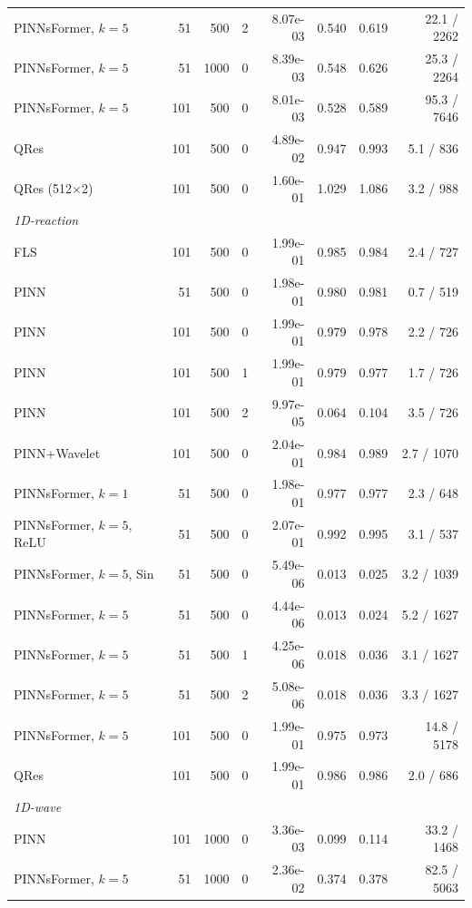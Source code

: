 \begin{table}[ht]
\begin{center}
\begin{tabular}{l r r r r r r r}
PINNsFormer, $k=5$ & 51 & 500 & 2 & 8.07e-03 & 0.540 & 0.619 & 22.1 / 2262 \\
PINNsFormer, $k=5$ & 51 & 1000 & 0 & 8.39e-03 & 0.548 & 0.626 & 25.3 / 2264 \\
PINNsFormer, $k=5$ & 101 & 500 & 0 & 8.01e-03 & 0.528 & 0.589 & 95.3 / 7646 \\
QRes & 101 & 500 & 0 & 4.89e-02 & 0.947 & 0.993 & 5.1 / 836 \\
QRes (512$\times$2) & 101 & 500 & 0 & 1.60e-01 & 1.029 & 1.086 & 3.2 / 988 \\
\midrule
\multicolumn{8}{l}{\textit{1D-reaction}} \\
FLS & 101 & 500 & 0 & 1.99e-01 & 0.985 & 0.984 & 2.4 / 727 \\
PINN & 51 & 500 & 0 & 1.98e-01 & 0.980 & 0.981 & 0.7 / 519 \\
PINN & 101 & 500 & 0 & 1.99e-01 & 0.979 & 0.978 & 2.2 / 726 \\
PINN & 101 & 500 & 1 & 1.99e-01 & 0.979 & 0.977 & 1.7 / 726 \\
PINN & 101 & 500 & 2 & 9.97e-05 & 0.064 & 0.104 & 3.5 / 726 \\
PINN+Wavelet & 101 & 500 & 0 & 2.04e-01 & 0.984 & 0.989 & 2.7 / 1070 \\
PINNsFormer, $k=1$ & 51 & 500 & 0 & 1.98e-01 & 0.977 & 0.977 & 2.3 / 648 \\
PINNsFormer, $k=5$, ReLU & 51 & 500 & 0 & 2.07e-01 & 0.992 & 0.995 & 3.1 / 537 \\
PINNsFormer, $k=5$, Sin & 51 & 500 & 0 & 5.49e-06 & 0.013 & 0.025 & 3.2 / 1039 \\
PINNsFormer, $k=5$ & 51 & 500 & 0 & 4.44e-06 & 0.013 & 0.024 & 5.2 / 1627 \\
PINNsFormer, $k=5$ & 51 & 500 & 1 & 4.25e-06 & 0.018 & 0.036 & 3.1 / 1627 \\
PINNsFormer, $k=5$ & 51 & 500 & 2 & 5.08e-06 & 0.018 & 0.036 & 3.3 / 1627 \\
PINNsFormer, $k=5$ & 101 & 500 & 0 & 1.99e-01 & 0.975 & 0.973 & 14.8 / 5178 \\
QRes & 101 & 500 & 0 & 1.99e-01 & 0.986 & 0.986 & 2.0 / 686 \\
\midrule
\multicolumn{8}{l}{\textit{1D-wave}} \\
PINN & 101 & 1000 & 0 & 3.36e-03 & 0.099 & 0.114 & 33.2 / 1468 \\
PINNsFormer, $k=5$ & 51 & 1000 & 0 & 2.36e-02 & 0.374 & 0.378 & 82.5 / 5063 \\
\bottomrule
\end{tabular}
\end{center}
\end{table}
